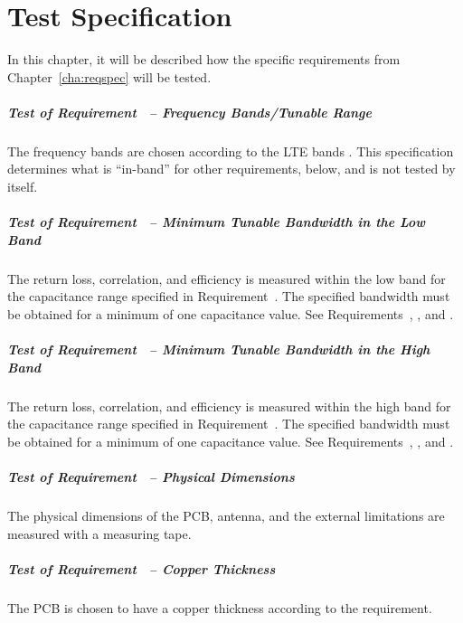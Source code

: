 \chapter{Test Specification}
In this chapter, it will be described how the specific requirements from Chapter~\ref{cha:reqspec} will be tested.

\paragraph{Test of Requirement~ -- Frequency Bands/Tunable Range}
The frequency bands are chosen according to the LTE bands \cite{radio2015electronics}. This specification determines what is ``in-band'' for other requirements, below, and is not tested by itself.

\paragraph{Test of Requirement~ -- Minimum Tunable Bandwidth in the Low Band}
The return loss, correlation, and efficiency is measured within the low band for the capacitance range specified in Requirement~. The specified bandwidth must be obtained for a minimum of one capacitance value. See Requirements~, , and .

\paragraph{Test of Requirement~ -- Minimum Tunable Bandwidth in the High Band}
The return loss, correlation, and efficiency is measured within the high band for the capacitance range specified in Requirement~. The specified bandwidth must be obtained for a minimum of one capacitance value. See Requirements~, , and .

\paragraph{Test of Requirement~ -- Physical Dimensions}
The physical dimensions of the PCB, antenna, and the external limitations are measured with a measuring tape. 

\paragraph{Test of Requirement~ -- Copper Thickness}
The PCB is chosen to have a copper thickness according to the requirement.

